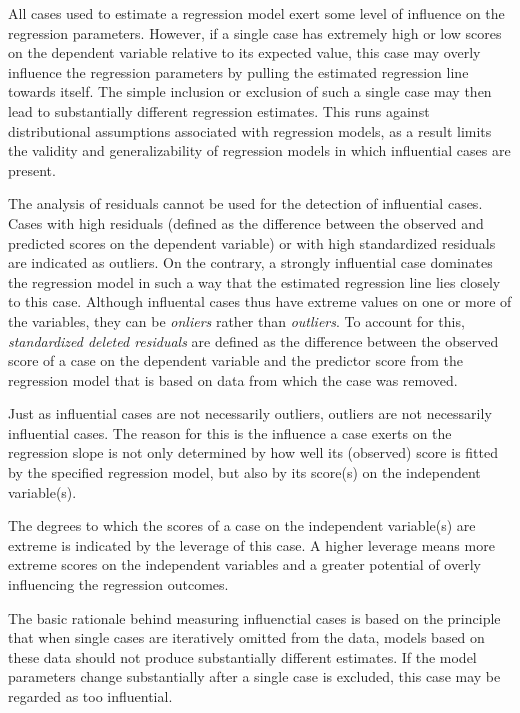 \documentclass[12pt,]{article}
\begin{document}
{All cases used to estimate a regression model exert some level of
influence on the regression parameters. However, if a single case has
extremely high or low scores on the dependent variable relative to its
expected value, this case may overly influence the regression parameters
by pulling the estimated regression line towards itself. The simple
inclusion or exclusion of such a single case may then lead to
substantially different regression estimates. This runs against
distributional assumptions associated with regression models, as a
result limits the validity and generalizability of regression models in
which influential cases are present.

The analysis of residuals cannot be used for the detection of
influential cases. Cases with high residuals (defined as the difference
between the observed and predicted scores on the dependent variable) or
with high standardized residuals are indicated as outliers. On the
contrary, a strongly influential case dominates the regression model in
such a way that the estimated regression line lies closely to this case.
Although influental cases thus have extreme values on one or more of the
variables, they can be \emph{onliers} rather than \emph{outliers}. To
account for this, \emph{standardized deleted residuals} are defined as
the difference between the observed score of a case on the dependent
variable and the predictor score from the regression model that is based
on data from which the case was removed.

Just as influential cases are not necessarily outliers, outliers are not
necessarily influential cases. The reason for this is the influence a
case exerts on the regression slope is not only determined by how well
its (observed) score is fitted by the specified regression model, but
also by its score(s) on the independent variable(s).

The degrees to which the scores of a case on the independent variable(s)
are extreme is indicated by the leverage of this case. A higher leverage
means more extreme scores on the independent variables and a greater
potential of overly influencing the regression outcomes.

The basic rationale behind measuring influenctial cases is based on the
principle that when single cases are iteratively omitted from the data,
models based on these data should not produce substantially different
estimates. If the model parameters change substantially after a single
case is excluded, this case may be regarded as too influential.

}
\end{document}
